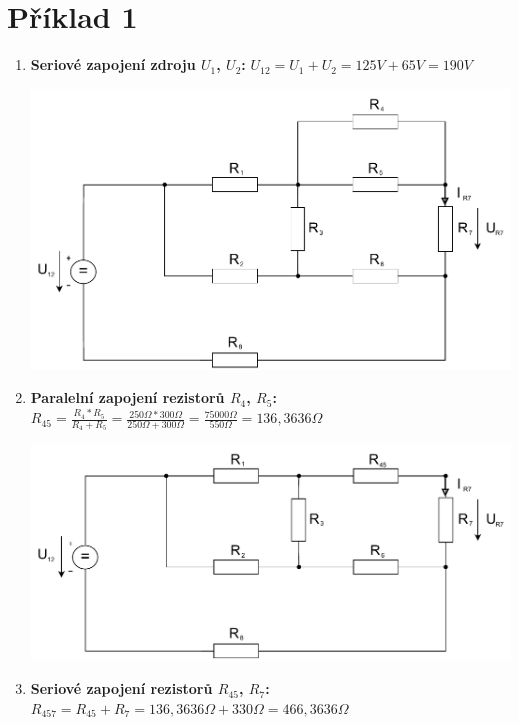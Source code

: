 \section{Příklad 1}

\begin{enumerate}
    \item \textbf{Seriové zapojení zdroju $U_1$, $U_2$:} \newline
    $U_{12} = U_1 + U_2 = 125V + 65V = 190V$
    
    \includegraphics[scale=0.7]{pr1/pr1.1pdf.pdf}
    
    \item \textbf{Paralelní zapojení rezistorů $R_4$, $R_5$:} \newline $R_{45} = \frac{R_4 * R_5}{R_4 + R_5} = \frac{250\Omega * 300\Omega}{250\Omega + 300\Omega} = \frac{75000\Omega}{550\Omega} = 136,3636\Omega$
    
    \includegraphics[scale=0.7]{pr1/pr1.2.pdf}
    
    \item \textbf{Seriové zapojení rezistorů $R_{45}$, $R_7$:} \newline
    $R_{457} = R_{45} + R_7 = 136,3636\Omega + 330\Omega = 466,3636\Omega$
    

\end{enumerate}
